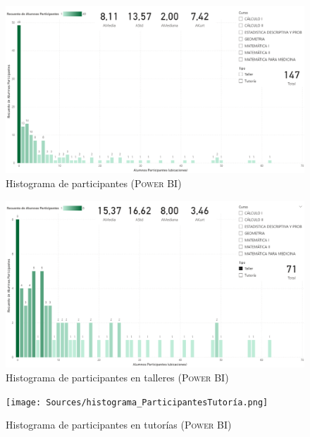 \documentclass[11pt,a4paper]{book}
\theoremstyle{definition}%
\begin{document}
                    \begin{figure}[H]
                        \centering
                        \includegraphics[width=1\textwidth]{Sources/histograma_ParticipantesGlobal.png}
                        \caption{Histograma de participantes (\textsc{Power BI})}
                        \label{fig:histograma_ParticipantesGlobal}
                    \end{figure}
                    \newpage
                    \begin{figure}[H]
                        \centering
                        \includegraphics[width=1\textwidth]{Sources/histograma_ParticipantesTaller.png}
                        \caption{Histograma de participantes en talleres (\textsc{Power BI})}
                        \label{fig:histograma_ParticipantesTaller}
                    \end{figure}
                    \begin{figure}[H]
                        \centering
                        \texttt{[image: Sources/histograma\_ParticipantesTutoría.png]}
                        \caption{Histograma de participantes en tutorías (\textsc{Power BI})}
                        \label{fig:histograma_ParticipantesTutoría}
                    \end{figure}
\end{document}
